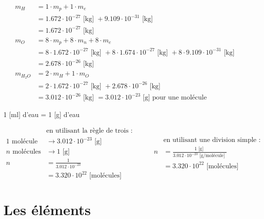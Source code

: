 \documentclass[
  11pt,
  a4paper,
  openany]{book}
\begin{document}
\begin{Answer}
\[ \begin{split}
    m_{H} &= 1 \cdot m_{p} + 1 \cdot m_{e}\\
          &= 1.672\cdot10^{-27}\text{ [kg] } + 9.109\cdot10^{-31}\text{ [kg] }\\
          &= 1.672\cdot10^{-27}\text{ [kg] }\\
    m_{O} &= 8 \cdot m_{p} + 8 \cdot m_{n} + 8 \cdot m_{e}\\
          &= 8 \cdot 1.672\cdot10^{-27}\text{ [kg] } + 8 \cdot 1.674\cdot10^{-27}\text{ [kg] } + 8 \cdot 9.109\cdot10^{-31}\text{ [kg] }\\
          &= 2.678\cdot10^{-26}\text{ [kg] }\\
    m_{H_{2}O} &= 2 \cdot m_{H} + 1 \cdot m_{O}\\
          &= 2 \cdot 1.672\cdot10^{-27}\text{ [kg] } + 2.678\cdot10^{-26}\text{ [kg] }\\
          &= 3.012\cdot10^{-26}\text{ [kg] } = 3.012\cdot10^{-23} \text{ [g] pour une molécule}
\end{split} \]

1 {[}ml{]} d'eau = 1 {[}g{]} d'eau

\[ \begin{split}
    & \text{en utilisant la règle de trois : } \\
    1 \text{ molécule} &\rightarrow 3.012\cdot10^{-23} \text{ [g] }\\
    n \text{ molécules} &\rightarrow 1 \text{ [g] }\\
    n &= \frac{1}{3.012\cdot10^{-23}}\\
      &= 3.320\cdot10^{22} \text{ [molécules]}
\end{split}
\qquad
\begin{split}
    & \text{en utilisant une division simple : } \\
    n &= \frac{1\text{ [g] }}{ 3.012\cdot10^{-23} \text{ [g/molécule] } } \\
    &= 3.320\cdot10^{22} \text{ [molécules]}
\end{split} \]

\end{Answer}

\newpage

\hypertarget{les-uxe9luxe9ments}{%
\section{Les éléments}\label{les-uxe9luxe9ments}}
\end{document}
